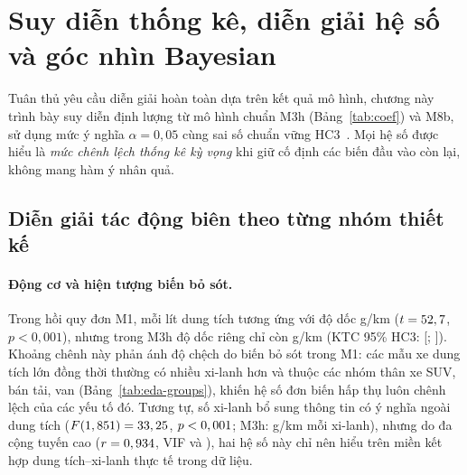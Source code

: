\section{Suy diễn thống kê, diễn giải hệ số và góc nhìn Bayesian}
\label{sec:questions}

Tuân thủ yêu cầu diễn giải hoàn toàn dựa trên kết quả mô hình, chương này trình bày suy diễn định lượng từ mô hình chuẩn M3h (Bảng~\ref{tab:coef}) và M8b, sử dụng mức ý nghĩa $\alpha = 0{,}05$ cùng sai số chuẩn vững HC3~\cite{len2023phantichdulieu}. Mọi hệ số được hiểu là \emph{mức chênh lệch thống kê kỳ vọng} khi giữ cố định các biến đầu vào còn lại, không mang hàm ý nhân quả.

\begin{table}[htbp]
  \centering
  \caption{Ước lượng 17 tham số của M3h trên tập huấn luyện: KTC 95\% OLS, KTC 95\% HC3, $p$ (HC3) và KĐTin 95\% Bayesian M6 (prior yếu). Nhóm tham chiếu: xăng thường (\texttt{X}), xe nhỏ, hộp số tự động \texttt{A}.}
  \label{tab:coef}
  \footnotesize
  \setlength{\tabcolsep}{4.2pt}
  
\end{table}

\subsection{Diễn giải tác động biên theo từng nhóm thiết kế}
\paragraph{Động cơ và hiện tượng biến bỏ sót.}
Trong hồi quy đơn M1, mỗi lít dung tích tương ứng với độ dốc \slopeOne{} g/km ($t = 52,7$, $p < 0{,}001$), nhưng trong M3h độ dốc riêng chỉ còn \bEngine{} g/km (KTC 95\% HC3: [\bEngineLo; \bEngineHi]). Khoảng chênh này phản ánh độ chệch do biến bỏ sót trong M1: các mẫu xe dung tích lớn đồng thời thường có nhiều xi-lanh hơn và thuộc các nhóm thân xe SUV, bán tải, van (Bảng~\ref{tab:eda-groups}), khiến hệ số đơn biến hấp thụ luôn chênh lệch của các yếu tố đó. Tương tự, số xi-lanh bổ sung thông tin có ý nghĩa ngoài dung tích ($F(1, 851) = 33,25$, $p < 0,001$; M3h: \bCyl{} g/km mỗi xi-lanh), nhưng do đa cộng tuyến cao ($r = 0,934$, VIF \vifEngine{} và \vifCyl{}), hai hệ số này chỉ nên hiểu trên miền kết hợp dung tích--xi-lanh thực tế trong dữ liệu.

